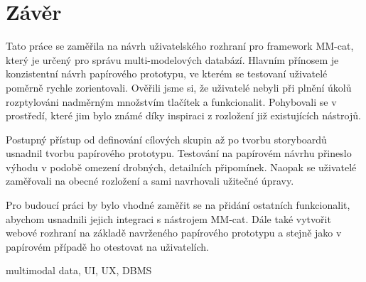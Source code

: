 \chapter*{Závěr}





Tato práce se zaměřila na návrh uživatelského rozhraní pro framework MM-cat, který je určený pro správu multi-modelových databází. Hlavním přínosem je konzistentní návrh papírového prototypu, ve kterém se testovaní uživatelé poměrně rychle zorientovali. Ověřili jsme si, že uživatelé nebyli při plnění úkolů rozptylováni nadměrným množstvím tlačítek a funkcionalit. Pohybovali se v prostředí, které jim bylo známé díky inspiraci z rozložení již existujících nástrojů.

Postupný přístup od definování cílových skupin až po tvorbu storyboardů usnadnil tvorbu papírového prototypu. Testování na papírovém návrhu přineslo výhodu v podobě omezení drobných, detailních připomínek. Naopak se uživatelé zaměřovali na obecné rozložení a sami navrhovali užitečné úpravy.

Pro budoucí práci by bylo vhodné zaměřit se na přidání ostatních funkcionalit, abychom usnadnili jejich integraci s nástrojem MM-cat. Dále také vytvořit webové rozhraní na základě navrženého papírového prototypu a stejně jako v papírovém případě ho otestovat na uživatelích.




multimodal data, UI, UX, DBMS

